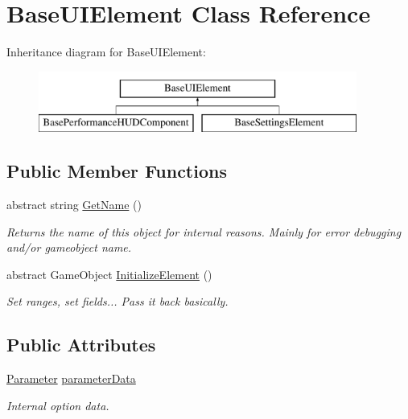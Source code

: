 \hypertarget{class_base_u_i_element}{}\section{Base\+U\+I\+Element Class Reference}
\label{class_base_u_i_element}
Inheritance diagram for Base\+U\+I\+Element\+:\begin{figure}[H]
\begin{center}
\leavevmode
\includegraphics[height=2.000000cm]{class_base_u_i_element}
\end{center}
\end{figure}
\subsection*{Public Member Functions}
\begin{DoxyCompactItemize}
\item 
abstract string \hyperlink{class_base_u_i_element_acb7fcd49138477941f2e43733ad9d34d}{Get\+Name} ()
\begin{DoxyCompactList}\small\item\em Returns the name of this object for internal reasons. Mainly for error debugging and/or gameobject name. \end{DoxyCompactList}\item 
abstract Game\+Object \hyperlink{class_base_u_i_element_a9a0aa6ac0b194f90e092b372adce4e30}{Initialize\+Element} ()
\begin{DoxyCompactList}\small\item\em Set ranges, set fields... Pass it back basically. \end{DoxyCompactList}\end{DoxyCompactItemize}
\subsection*{Public Attributes}
\begin{DoxyCompactItemize}
\item 
\hyperlink{class_parameter}{Parameter} \hyperlink{class_base_u_i_element_a1c66251d0672fb0931f92f5f604bd56a}{parameter\+Data}
\begin{DoxyCompactList}\small\item\em Internal option data. \end{DoxyCompactList}\end{DoxyCompactItemize}
